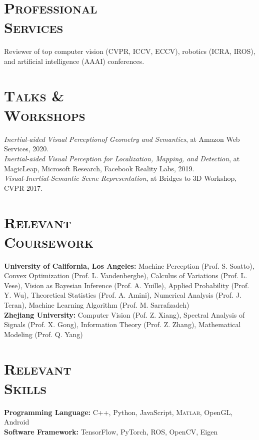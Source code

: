 \documentclass[margin, line, 10pt]{res} %
\begin{document}
\begin{resume}
\section{\textsc{Professional\\Services}}
Reviewer of top computer vision (CVPR, ICCV, ECCV), robotics (ICRA, IROS), and artificial intelligence (AAAI) conferences.

\section{\textsc{Talks \&\\Workshops}}
\textit{Inertial-aided Visual Perceptionof Geometry and Semantics}, at Amazon Web Services, 2020.\\
\textit{Inertial-aided Visual Perception for Localization, Mapping, and Detection}, at MagicLeap, Microsoft Research, Facebook Reality Labs, 2019.\\
\textit{Visual-Inertial-Semantic Scene Representation}, at Bridges to 3D Workshop, CVPR 2017.


\section{\textsc{Relevant\\Coursework}}
\textbf{University of California, Los Angeles:} Machine Perception (Prof. S. Soatto), Convex Optimization (Prof. L. Vandenberghe), Calculus of Variations (Prof. L. Vese), Vision as Bayesian Inference (Prof. A. Yuille), Applied Probability (Prof. Y. Wu), Theoretical Statistics (Prof. A. Amini), Numerical Analysis (Prof. J. Teran), Machine Learning Algorithm (Prof. M. Sarrafzadeh)\\
\textbf{Zhejiang University:} Computer Vision (Pof. Z. Xiang), Spectral Analysis of Signals (Prof. X. Gong), Information Theory (Prof. Z. Zhang), Mathematical Modeling (Prof. Q. Yang)

\section{\textsc{Relevant\\Skills}}
\textbf{Programming Language:} C++, Python, JavaScript, \textsc{Matlab}, OpenGL, Android\\
\textbf{Software Framework:} TensorFlow, PyTorch, ROS, OpenCV, Eigen


\end{resume}
\end{document}
